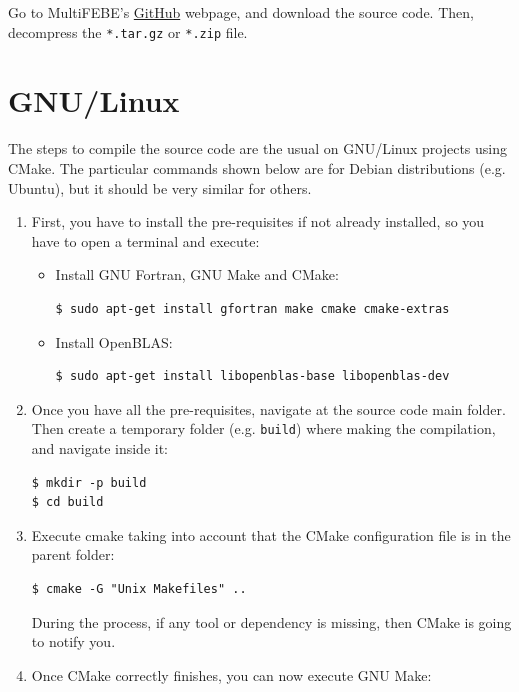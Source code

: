 \documentclass[a4paper,fleqn]{book}
\begin{document}
\label{ap:compilation}

Go to MultiFEBE's \href{https://github.com/mmc-siani-es/MultiFEBE}{GitHub} webpage, and download the source code. Then, decompress the \texttt{*.tar.gz} or \texttt{*.zip} file.

\section{GNU/Linux}

The steps to compile the source code are the usual on GNU/Linux projects using CMake. The particular commands shown below are for Debian distributions (e.g. Ubuntu), but it should be very similar for others. 
\begin{enumerate}
    \item First, you have to install the pre-requisites if not already installed, so you have to open a terminal and execute:
    \begin{itemize}
        \item Install GNU Fortran, GNU Make and CMake:
\begin{Verbatim}[frame=single, fontsize=\small]
$ sudo apt-get install gfortran make cmake cmake-extras
\end{Verbatim}
        \item Install OpenBLAS:
\begin{Verbatim}[frame=single, fontsize=\small]
$ sudo apt-get install libopenblas-base libopenblas-dev
\end{Verbatim}
    \end{itemize}
    \item Once you have all the pre-requisites, navigate at the source code main folder. Then create a temporary folder (e.g. \texttt{build}) where making the compilation, and navigate inside it:
\begin{Verbatim}[frame=single, fontsize=\small]
$ mkdir -p build
$ cd build
\end{Verbatim}
    \item Execute cmake taking into account that the CMake configuration file is in the parent folder:
\begin{Verbatim}[frame=single, fontsize=\small]
$ cmake -G "Unix Makefiles" ..
\end{Verbatim}
    During the process, if any tool or dependency is missing, then CMake is going to notify you.
    \item Once CMake correctly finishes, you can now execute GNU Make:
\begin{Verbatim}[frame=single, fontsize=\small]

\end{Verbatim}
\end{enumerate}
\end{document}

